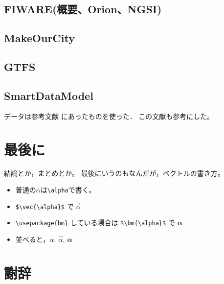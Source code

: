 \documentclass[a4paper, 12pt]{jsreport}
\begin{document}
  \section{FIWARE(概要、Orion、NGSI)}
  \section{MakeOurCity}
  \section{GTFS}
  \section{SmartDataModel}


  データは参考文献\cite{rika} にあったものを使った． この文献\cite{ten}も参考にした。


  \chapter{最後に}


  結論とか，まとめとか。 最後にいうのもなんだが，ベクトルの書き方。
  \begin{itemize}
    \item 普通の$\alpha$は\verb|\alpha|で書く。

    \item \verb|$\vec{\alpha}$| で $\vec{\alpha}$

    \item \verb|\usepackage{bm}| している場合は \verb|$\bm{\alpha}$| で $\bm{\alpha}$

    \item 並べると，$\alpha$, $\vec{\alpha}$, $\bm{\alpha}$
  \end{itemize}

  \chapter*{謝辞}
\end{document}
